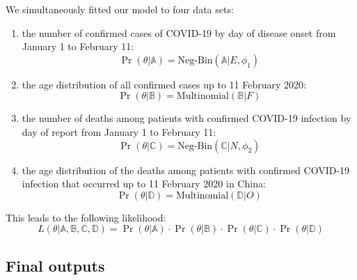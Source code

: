 \documentclass{article}
\begin{document}
	We simultaneously fitted our model to four data sets: 
	\begin{enumerate}
		\item the number of confirmed cases of COVID-19 by day of disease onset from January 1 to February 11:
		\begin{equation}
		\Pr(\theta| \mathds{A}) = \text{Neg-Bin}(\mathds{A}|E,\phi_1)
		\end{equation}
		
		\item the age distribution of all confirmed cases up to 11 February 2020:
		\begin{equation}
		\Pr(\theta| \mathds{B}) = \text{Multinomial}(\mathds{B}|F)
		\end{equation}
		
		\item the number of deaths among patients with confirmed COVID-19 infection by day of report from January 1 to February 11:
		\begin{equation}
		\Pr(\theta| \mathds{C}) = \text{Neg-Bin}(\mathds{C}|N,\phi_2)
		\end{equation}
		
		\item the age distribution of the deaths among patients with confirmed COVID-19 infection that occurred up to 11 February 2020 in China:
		\begin{equation}
		\Pr(\theta| \mathds{D}) = \text{Multinomial}(\mathds{D}|O)
		\end{equation}
	\end{enumerate}
	This leads to the following likelihood:
	\begin{equation}
	L(\theta | \mathds{A},\mathds{B},\mathds{C},\mathds{D}) = \Pr(\theta| \mathds{A}) \cdot \Pr(\theta| \mathds{B}) \cdot \Pr(\theta| \mathds{C}) \cdot \Pr(\theta| \mathds{D})
	\end{equation}
	
	\subsection{Final outputs}
	
\end{document}
